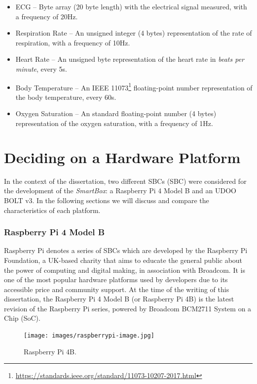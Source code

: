 \begin{itemize}
    \item \acf{ECG} -- Byte array (20 byte length) with the electrical signal measured, with a frequency of 20Hz.
    \item Respiration Rate -- An unsigned integer (4 bytes) representation of the rate of respiration, with a frequency of 10Hz.
    \item Heart Rate -- An unsigned byte representation of the heart rate in \textit{beats per minute}, every 5s.
    \item Body Temperature -- An IEEE 11073\footnote{\url{https://standards.ieee.org/standard/11073-10207-2017.html}} floating-point number representation of the body temperature, every 60s.
    \item Oxygen Saturation -- An standard floating-point number (4 bytes) representation of the oxygen saturation, with a frequency of 1Hz.
\end{itemize}


\section{Deciding on a Hardware Platform}

In the context of the dissertation, two different \acl{SBC}s (\acs{SBC}) were considered for the development of the \textit{SmartBox}: a Raspberry Pi 4 Model B and an UDOO BOLT v3. In the following sections we will discuss and compare the characteristics of each platform. 

\subsubsection{Raspberry Pi 4 Model B}

Raspberry Pi denotes a series of \acs{SBC}s which are developed by the Raspberry Pi Foundation, a UK-based charity that aims to educate the general public about the power of computing and digital making, in association with Broadcom. It is one of the most popular hardware platforms used by developers due to its accessible price and community support.
At the time of the writing of this dissertation, the Raspberry Pi 4 Model B (or Raspberry Pi 4B) is the latest revision of the Raspberry Pi series, powered by Broadcom BCM2711 System on a Chip (SoC). 

\begin{figure}[H]
    \centering
    \texttt{[image: images/raspberrypi-image.jpg]}
    \caption{Raspberry Pi 4B.}
    \label{fig:raspberrypi-image}
\end{figure}

